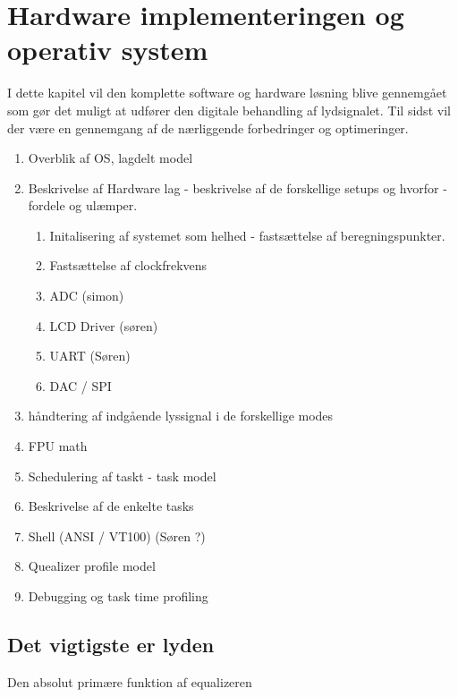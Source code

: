 \chapter{Hardware implementeringen og operativ system}\label{kap:hardware}

I dette kapitel vil den komplette software og hardware løsning blive gennemgået som gør det muligt at udfører den digitale behandling af lydsignalet.
Til sidst vil der være en gennemgang af de nærliggende forbedringer og optimeringer.


\begin{enumerate}
	\item Overblik af OS, lagdelt model
	\item Beskrivelse af Hardware lag - beskrivelse af de forskellige setups og hvorfor - fordele og ulæmper.
	\begin{enumerate}
		\item Initalisering af systemet som helhed - fastsættelse af beregningspunkter.
		\item Fastsættelse af clockfrekvens
		\item ADC (simon)
		\item LCD Driver (søren)
		\item UART (Søren)
		\item DAC / SPI
	\end{enumerate}
	\item håndtering af indgående lyssignal i de forskellige modes
	\item FPU math
	\item Schedulering af taskt - task model 
	\item Beskrivelse af de enkelte tasks
	\item Shell (ANSI / VT100) (Søren ?) 
	\item Quealizer profile model
	\item Debugging og task time profiling
	
\end{enumerate}

\section{Det vigtigste er lyden}
Den absolut primære funktion af equalizeren   



